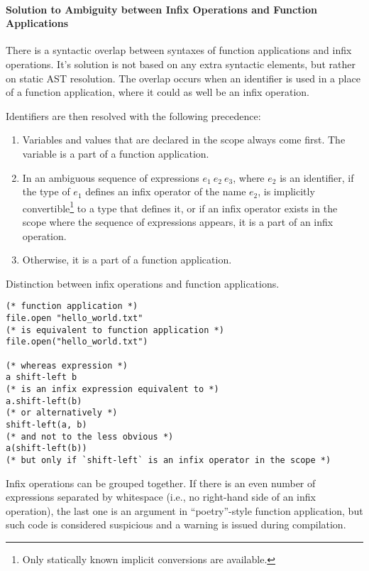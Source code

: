 \paragraph{Solution to Ambiguity between Infix Operations and Function Applications}

There is a syntactic overlap between syntaxes of function applications and infix operations. It's solution is not based on any extra syntactic elements, but rather on static AST resolution. The overlap occurs when an identifier is used in a place of a function application, where it could as well be an infix operation. 

Identifiers are then resolved with the following precedence:
\begin{enumerate}
  \item Variables and values that are declared in the scope always come first. The variable is a part of a function application. 
  \item In an ambiguous sequence of expressions $e_1\ e_2\ e_3$, where $e_2$ is an identifier, if the type of $e_1$ defines an infix operator of the name $e_2$, is implicitly convertible\footnote{Only statically known implicit conversions are available.} to a type that defines it, or if an infix operator exists in the scope where the sequence of expressions appears, it is a part of an infix operation. 
  \item Otherwise, it is a part of a function application.  
\end{enumerate}

\example Distinction between infix operations and function applications. 
\begin{lstlisting}
(* function application *)
file.open "hello_world.txt"
(* is equivalent to function application *)
file.open("hello_world.txt")

(* whereas expression *)
a shift-left b
(* is an infix expression equivalent to *)
a.shift-left(b)
(* or alternatively *)
shift-left(a, b)
(* and not to the less obvious *)
a(shift-left(b))
(* but only if `shift-left` is an infix operator in the scope *)
\end{lstlisting}

Infix operations can be grouped together. If there is an even number of expressions separated by whitespace (i.e., no right-hand side of an infix operation), the last one is an argument in ``poetry''-style function application, but such code is considered suspicious and a warning is issued during compilation. 





